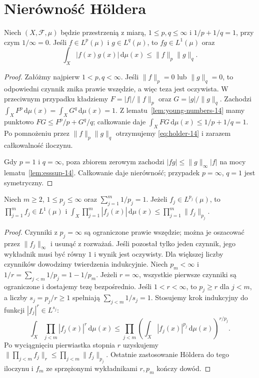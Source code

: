 \section{Nierówność Höldera}
\begin{twierdzenie}[Hölder]
\label{thm:holder-14}
Niech $(X,\mathcal F,\mu)$ będzie przestrzenią z miarą,
$1\le p,q\le\infty$ i $1/p+1/q=1$, przy czym $1/\infty=0$.
Jeśli $f\in L^p(\mu)$ i $g\in L^q(\mu)$,
to $fg\in L^1(\mu)$ oraz
\begin{equation}\label{eq:holder-14}
\int_X|f(x)g(x)|\,\mathrm d\mu(x)
\le\|f\|_p\|g\|_q.
\end{equation}
\end{twierdzenie}
\begin{proof}
Załóżmy najpierw $1<p,q<\infty$.
Jeśli $\|f\|_p=0$ lub $\|g\|_q=0$,
to odpowiedni czynnik znika prawie wszędzie,
a więc teza jest oczywista. W przeciwnym przypadku
kładziemy $F=|f|/\|f\|_p$ oraz $G=|g|/\|g\|_q$.
Zachodzi $\int_XF^p\,\mathrm d\mu(x)=
\int_XG^q\,\mathrm d\mu(x)=1$.
Z lematu~\ref{lem:young-numbers-14} mamy punktowo
$FG\le F^p/p+G^q/q$; całkowanie daje
$\int_XFG\,\mathrm d\mu(x)\le1/p+1/q=1$.
Po pomnożeniu przez $\|f\|_p\|g\|_q$ otrzymujemy
\eqref{eq:holder-14} i zarazem całkowalność iloczynu.

Gdy $p=1$ i $q=\infty$, poza zbiorem zerowym zachodzi
$|fg|\le\|g\|_\infty|f|$ na mocy
lematu~\ref{lem:esssup-14}. Całkowanie daje nierówność;
przypadek $p=\infty$, $q=1$ jest symetryczny.
\end{proof}

\begin{wniosek}
\label{cor:generalized-holder-14}
Niech $m\ge2$, $1\le p_j\le\infty$ oraz
$\sum_{j=1}^m1/p_j=1$. Jeżeli $f_j\in L^{p_j}(\mu)$,
to $\prod_{j=1}^m f_j\in L^1(\mu)$ i
$\int_X\prod_{j=1}^m|f_j(x)|\,\mathrm d\mu(x)
\le\prod_{j=1}^m\|f_j\|_{p_j}$.
\end{wniosek}
\begin{proof}
Czynniki z $p_j=\infty$ są ograniczone prawie wszędzie;
można je oszacować przez $\|f_j\|_\infty$ i usunąć
z rozważań. Jeśli pozostał tylko jeden czynnik,
jego wykładnik musi być równy $1$ i wynik jest oczywisty.
Dla większej liczby czynników dowodzimy twierdzenia indukcyjnie.
Niech $p_m<\infty$ i $1/r=\sum_{j<m}1/p_j=1-1/p_m$.
Jeżeli $r=\infty$, wszystkie pierwsze czynniki
są ograniczone i dostajemy tezę bezpośrednio.
Jeśli $1<r<\infty$, to $p_j\ge r$ dla $j<m$,
a liczby $s_j=p_j/r\ge1$ spełniają
$\sum_{j<m}1/s_j=1$. Stosujemy krok indukcyjny
do funkcji $|f_j|^r\in L^{s_j}$:
\[
\int_X\prod_{j<m}|f_j(x)|^r\,\mathrm d\mu(x)
\le\prod_{j<m}\left(\int_X|f_j(x)|^{p_j}\,
\mathrm d\mu(x)\right)^{r/p_j}.
\]
Po wyciągnięciu pierwiastka stopnia $r$ uzyskujemy
$\|\prod_{j<m}f_j\|_r\le\prod_{j<m}\|f_j\|_{p_j}$.
Ostatnie zastosowanie Höldera do tego iloczynu i $f_m$
ze sprzężonymi wykładnikami $r,p_m$ kończy dowód.
\end{proof}

